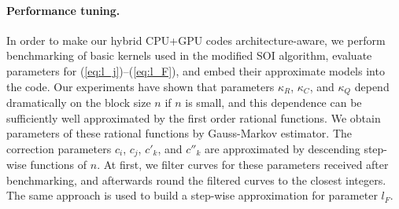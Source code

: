 \documentclass{llncs}
\begin{document}
\paragraph{Performance tuning.} %
\label{sec:BB_performance}
%
In order to make our hybrid CPU+GPU codes architecture-aware, 
we perform benchmarking of basic kernels used in the modified SOI algorithm, 
evaluate parameters for (\ref{eq:l_j})--(\ref{eq:l_F}), 
and embed their approximate models into the code.
% 
Our experiments have shown that 
parameters $\kappa_R$, $\kappa_C$, and $\kappa_Q$ 
depend dramatically on the block size $n$ if $n$ is small, and
this dependence can be sufficiently well
approximated by the first order rational functions. 
We obtain parameters of these rational functions 
by Gauss-Markov estimator. 
% 
The correction parameters $c_i$, $c_j$, $c'_k$, and $c''_k$ %
are approximated by descending step-wise functions of $n$.
At first, we filter curves for these parameters received after benchmarking, %
and afterwards round the filtered curves to the closest integers.
The same approach is used to build a step-wise approximation for parameter $l_F$.
\end{document}
